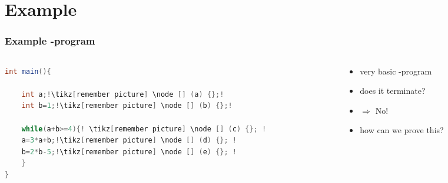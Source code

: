 \section{Example}
\frame{\tableofcontents[currentsection]}

\begin{frame}[fragile] %
  \frametitle{Example -program} %
  \begin{columns}
  	\begin{column}{6cm}
  		\begin{lstlisting}[language = java,escapechar = !]
int main(){
  		
	int a;!\tikz[remember picture] \node [] (a) {};!
	int b=1;!\tikz[remember picture] \node [] (b) {};!
  		
	while(a+b>=4){! \tikz[remember picture] \node [] (c) {}; !
    a=3*a+b;!\tikz[remember picture] \node [] (d) {}; !
    b=2*b-5;!\tikz[remember picture] \node [] (e) {}; !
	}
}		
  		\end{lstlisting}
%  		
%  		
  	\end{column}
	\begin{column}{5cm}
		\begin{itemize}			
			\item very basic -program
			\item does it terminate?
			\item[] $\Rightarrow$ \color{red}No!\color{black}
			\item[] how can we prove this?
		\end{itemize}
	\end{column}
  \end{columns}
\end{frame}